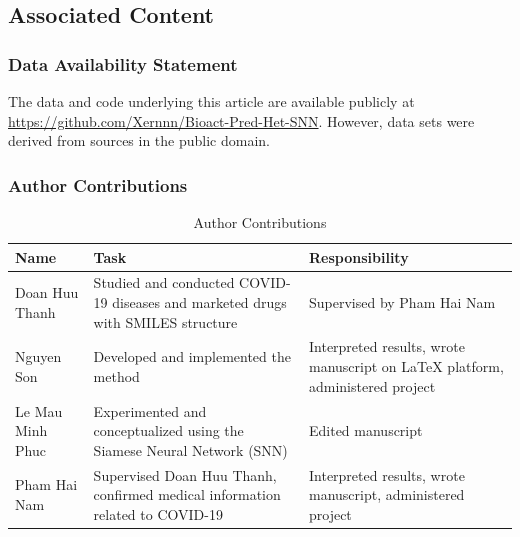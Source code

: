 \documentclass[conference]{IEEEtran}
\begin{document}
\subsection*{Associated Content}
\subsubsection*{Data Availability Statement}
The data and code underlying this article are available publicly at \url{https://github.com/Xernnn/Bioact-Pred-Het-SNN}. However, data sets were derived from sources in the public domain.\\

\subsubsection*{Author Contributions}
\begin{table}[h!]
  \centering
  \caption{Author Contributions}
  \label{tab:Author Contributions}
  \begin{tabular}{|>{\centering\arraybackslash}m{2cm}|>{\centering\arraybackslash}m{3cm}|>{\centering\arraybackslash}m{3cm}|}
    \hline
    \rowcolor{headercolor}
    \textbf{Name}    & \textbf{Task}                                                                    & \textbf{Responsibility}                                                       \\ \hline
    Doan Huu Thanh   & Studied and conducted COVID-19 diseases and marketed drugs with SMILES structure & Supervised by Pham Hai Nam                                                    \\ \hline
    Nguyen Son       & Developed and implemented the method                                             & Interpreted results, wrote manuscript on LaTeX platform, administered project \\ \hline
    Le Mau Minh Phuc & Experimented and conceptualized using the Siamese Neural Network (SNN)           & Edited manuscript                                                             \\ \hline
    Pham Hai Nam     & Supervised Doan Huu Thanh, confirmed medical information related to COVID-19     & Interpreted results, wrote manuscript, administered project                   \\ \hline
  \end{tabular}
\end{table}


\clearpage
\end{document}
